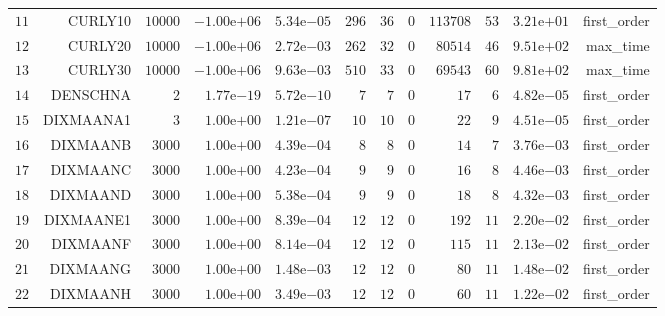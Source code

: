 \begin{longtable}{rrrrrrrrrrrr}
  \(    11\) & CURLY10 & \( 10000\) & \(-1.00\)e\(+06\) & \( 5.34\)e\(-05\) & \(   296\) & \(    36\) & \(     0\) & \(113708\) & \(    53\) & \( 3.21\)e\(+01\) & first\_order \\
  \(    12\) & CURLY20 & \( 10000\) & \(-1.00\)e\(+06\) & \( 2.72\)e\(-03\) & \(   262\) & \(    32\) & \(     0\) & \( 80514\) & \(    46\) & \( 9.51\)e\(+02\) & max\_time \\
  \(    13\) & CURLY30 & \( 10000\) & \(-1.00\)e\(+06\) & \( 9.63\)e\(-03\) & \(   510\) & \(    33\) & \(     0\) & \( 69543\) & \(    60\) & \( 9.81\)e\(+02\) & max\_time \\
  \(    14\) & DENSCHNA & \(     2\) & \( 1.77\)e\(-19\) & \( 5.72\)e\(-10\) & \(     7\) & \(     7\) & \(     0\) & \(    17\) & \(     6\) & \( 4.82\)e\(-05\) & first\_order \\
  \(    15\) & DIXMAANA1 & \(     3\) & \( 1.00\)e\(+00\) & \( 1.21\)e\(-07\) & \(    10\) & \(    10\) & \(     0\) & \(    22\) & \(     9\) & \( 4.51\)e\(-05\) & first\_order \\
  \(    16\) & DIXMAANB & \(  3000\) & \( 1.00\)e\(+00\) & \( 4.39\)e\(-04\) & \(     8\) & \(     8\) & \(     0\) & \(    14\) & \(     7\) & \( 3.76\)e\(-03\) & first\_order \\
  \(    17\) & DIXMAANC & \(  3000\) & \( 1.00\)e\(+00\) & \( 4.23\)e\(-04\) & \(     9\) & \(     9\) & \(     0\) & \(    16\) & \(     8\) & \( 4.46\)e\(-03\) & first\_order \\
  \(    18\) & DIXMAAND & \(  3000\) & \( 1.00\)e\(+00\) & \( 5.38\)e\(-04\) & \(     9\) & \(     9\) & \(     0\) & \(    18\) & \(     8\) & \( 4.32\)e\(-03\) & first\_order \\
  \(    19\) & DIXMAANE1 & \(  3000\) & \( 1.00\)e\(+00\) & \( 8.39\)e\(-04\) & \(    12\) & \(    12\) & \(     0\) & \(   192\) & \(    11\) & \( 2.20\)e\(-02\) & first\_order \\
  \(    20\) & DIXMAANF & \(  3000\) & \( 1.00\)e\(+00\) & \( 8.14\)e\(-04\) & \(    12\) & \(    12\) & \(     0\) & \(   115\) & \(    11\) & \( 2.13\)e\(-02\) & first\_order \\
  \(    21\) & DIXMAANG & \(  3000\) & \( 1.00\)e\(+00\) & \( 1.48\)e\(-03\) & \(    12\) & \(    12\) & \(     0\) & \(    80\) & \(    11\) & \( 1.48\)e\(-02\) & first\_order \\
  \(    22\) & DIXMAANH & \(  3000\) & \( 1.00\)e\(+00\) & \( 3.49\)e\(-03\) & \(    12\) & \(    12\) & \(     0\) & \(    60\) & \(    11\) & \( 1.22\)e\(-02\) & first\_order \\

\end{longtable}
